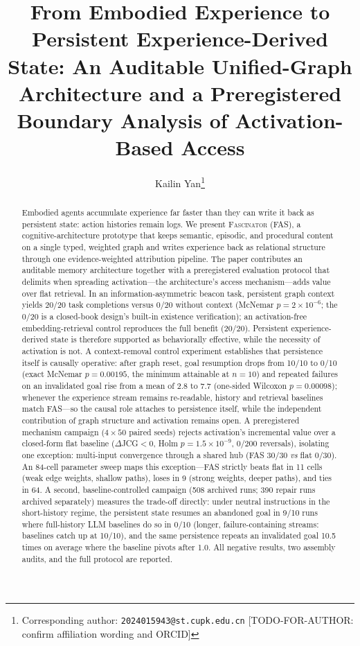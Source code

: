 \documentclass[10pt]{article}
\title{\bfseries From Embodied Experience to Persistent Experience-Derived State: An Auditable Unified-Graph Architecture and a Preregistered Boundary Analysis of Activation-Based Access}
\author{Kailin Yan\thanks{Corresponding author: \texttt{2024015943@st.cupk.edu.cn} [TODO-FOR-AUTHOR: confirm affiliation wording and ORCID]}}
\date{}
\begin{document}
\maketitle

\begin{abstract}
Embodied agents accumulate experience far faster than they can write it back as persistent state: action histories remain logs. We present \textsc{Fascinator} (FAS), a cognitive-architecture prototype that keeps semantic, episodic, and procedural content on a single typed, weighted graph and writes experience back as relational structure through one evidence-weighted attribution pipeline. The paper contributes an auditable memory architecture together with a preregistered evaluation protocol that delimits when spreading activation---the architecture's access mechanism---adds value over flat retrieval. In an information-asymmetric beacon task, persistent graph context yields 20/20 task completions versus 0/20 without context (McNemar $p{=}2\times10^{-6}$; the 0/20 is a closed-book design's built-in existence verification); an activation-free embedding-retrieval control reproduces the full benefit (20/20). Persistent experience-derived state is therefore supported as behaviorally effective, while the necessity of activation is not. A context-removal control experiment establishes that persistence itself is causally operative: after graph reset, goal resumption drops from 10/10 to 0/10 (exact McNemar $p{=}0.00195$, the minimum attainable at $n{=}10$) and repeated failures on an invalidated goal rise from a mean of 2.8 to 7.7 (one-sided Wilcoxon $p{=}0.00098$); whenever the experience stream remains re-readable, history and retrieval baselines match FAS---so the causal role attaches to persistence itself, while the independent contribution of graph structure and activation remains open. A preregistered mechanism campaign ($4\times50$ paired seeds) rejects activation's incremental value over a closed-form flat baseline ($\Delta$JCG${<}0$, Holm $p{=}1.5\times10^{-9}$, 0/200 reversals), isolating one exception: multi-input convergence through a shared hub (FAS 30/30 \emph{vs} flat 0/30). An 84-cell parameter sweep maps this exception---FAS strictly beats flat in 11 cells (weak edge weights, shallow paths), loses in 9 (strong weights, deeper paths), and ties in 64. A second, baseline-controlled campaign (508 archived runs; 390 repair runs archived separately) measures the trade-off directly: under neutral instructions in the short-history regime, the persistent state resumes an abandoned goal in 9/10 runs where full-history LLM baselines do so in 0/10 (longer, failure-containing streams: baselines catch up at 10/10), and the same persistence repeats an invalidated goal 10.5 times on average where the baseline pivots after 1.0. All negative results, two assembly audits, and the full protocol are reported.
\end{abstract}
\end{document}
